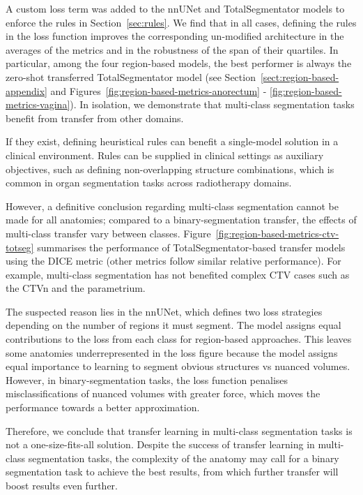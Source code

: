 \documentclass[11pt,twoside]{report}
\begin{document}
\begin{minipage}[c]{.55\linewidth}

    A custom loss term was added to the nnUNet and TotalSegmentator models to enforce the rules in Section~\ref{sec:rules}. We find that in all cases, defining the rules in the loss function improves the corresponding un-modified architecture in the averages of the metrics and in the robustness of the span of their quartiles. In particular, among the four region-based models, the best performer is always the zero-shot transferred TotalSegmentator model (see Section~\ref{sect:region-based-appendix} and Figures~\ref{fig:region-based-metrics-anorectum} - \ref{fig:region-based-metrics-vagina}). In isolation, we demonstrate that multi-class segmentation tasks benefit from transfer from other domains.
    
    \vspace{1em}

    If they exist, defining heuristical rules can benefit a single-model solution in a clinical environment. Rules can be supplied in clinical settings as auxiliary objectives, such as defining non-overlapping structure combinations, which is common in organ segmentation tasks across radiotherapy domains.

    \vspace{1em}

    However, a definitive conclusion regarding multi-class segmentation cannot be made for all anatomies; compared to a binary-segmentation transfer, the effects of multi-class transfer vary between classes. Figure~\ref{fig:region-based-metrics-ctv-totseg} summarises the performance of TotalSegmentator-based transfer models using the DICE metric (other metrics follow similar relative performance). For example, multi-class segmentation has not benefited complex CTV cases such as the CTVn and the parametrium. 

    \vspace{1em}

    The suspected reason lies in the nnUNet, which defines two loss strategies depending on the number of regions it must segment. The model assigns equal contributions to the loss from each class for region-based approaches. This leaves some anatomies underrepresented in the loss figure because the model assigns equal importance to learning to segment obvious structures vs nuanced volumes. However, in binary-segmentation tasks, the loss function penalises misclassifications of nuanced volumes with greater force, which moves the performance towards a better approximation.

    \vspace{1em}

    Therefore, we conclude that transfer learning in multi-class segmentation tasks is not a one-size-fits-all solution. Despite the success of transfer learning in multi-class segmentation tasks, the complexity of the anatomy may call for a binary segmentation task to achieve the best results, from which further transfer will boost results even further.

\end{minipage}%
\end{document}
